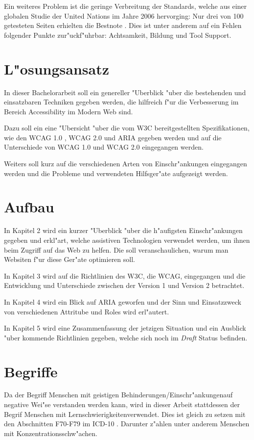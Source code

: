 \documentclass[a4paper,bibtotoc,oneside]{scrbook}
\begin{document}
Ein weiteres Problem ist die geringe Verbreitung der Standards, welche aus einer globalen Studie der United Nations im Jahre 2006 hervorging\cite{acc_report}: Nur drei von 100 getesteten Seiten erhielten die Bestnote \cite [S. 7]{acc_report}. Dies ist unter anderem auf ein Fehlen folgender Punkte zur"uckf"uhrbar: Achtsamkeit, Bildung und Tool Support\cite[S. 13]{tool_acc}.


\section{L"osungsansatz}
In dieser Bachelorarbeit soll ein genereller "Uberblick "uber die bestehenden und einsatzbaren Techniken gegeben werden, die hilfreich f"ur die Verbesserung im Bereich Accessibility im Modern Web sind. 

Dazu soll ein eine "Ubersicht "uber die vom W3C bereitgestellten Spezifikationen, wie den WCAG 1.0 \cite{wcag1}, WCAG 2.0 \cite{wcag2} und ARIA \cite{aria} gegeben werden und auf die Unterschiede von WCAG 1.0 und WCAG 2.0 eingegangen werden.

Weiters soll kurz auf die verschiedenen Arten von Einschr"ankungen eingegangen werden und die Probleme und verwendeten Hilfsger"ate aufgezeigt werden.

\section{Aufbau}
In Kapitel 2 wird ein kurzer "Uberblick "uber die h"aufigsten Einschr"ankungen gegeben und erkl"art, welche assistiven Technologien verwendet werden, um ihnen beim Zugriff auf das Web zu helfen. Die soll veranschaulichen, warum man Websiten f"ur diese Ger"ate optimieren soll.

In Kapitel 3 wird auf die Richtlinien des W3C, die WCAG, eingegangen und die Entwicklung und Unterschiede zwischen der Version 1 und Version 2 betrachtet.

In Kapitel 4 wird ein Blick auf ARIA geworfen und der Sinn und Einsatzzweck von verschiedenen Attritube und Roles wird erl"autert.

In Kapitel 5 wird eine Zusammenfassung der jetzigen Situation und ein Ausblick "uber kommende Richtlinien gegeben, welche sich noch im \emph{Draft} Status befinden.

\section{Begriffe}
Da der Begriff \glqq Menschen mit geistigen Behinderungen/Einschr"ankungen\grqq auf negative Wei"se verstanden werden kann, wird in dieser Arbeit stattdessen der Begrif \glqq Menschen mit Lernschwierigkeiten\grqq  verwendet. Dies ist gleich zu setzen mit den Abschnitten F70-F79 im ICD-10 \cite{icd10}. Darunter z"ahlen unter anderem Menschen mit Konzentrationsschw"achen.
\end{document}
